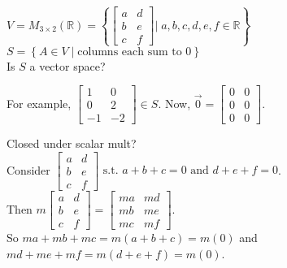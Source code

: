 \documentclass[../main.tex]{subfiles}
\begin{document}
\begin{example}
    \( V = M_{3 \times 2}(\mathbb{R}) =\left\{ \begin{bmatrix} a & d \\ b & e \\ c & f \end{bmatrix} \Bigg\vert \; a,b,c,d,e,f \in \mathbb{R} \right\} \) \\
    \( S = \left\{ A \in V \mid \text{columns each sum to 0} \right\} \) \\
    Is \( S \) a vector space?
    
    For example, \( \begin{bmatrix} 1 & 0 \\ 0 & 2 \\ -1 & -2 \end{bmatrix} \in S \).
    Now, \( \vec{0} = \begin{bmatrix} 0 & 0 \\ 0 & 0 \\ 0 & 0 \end{bmatrix} \).

    Closed under scalar mult? \checkmark \\
    Consider \( \begin{bmatrix} a & d \\ b & e \\ c & f \end{bmatrix} \text{ s.t. } a+b+c = 0 \text{ and } d+e+f=0 \). \\
    Then \( m\begin{bmatrix} a & d \\ b & e \\ c & f \end{bmatrix} = \begin{bmatrix} ma & md \\ mb & me \\ mc & mf \end{bmatrix} \). \\
    So \( ma+mb+mc = m(a+b+c) = m(0) \) and \( md+me+mf = m(d+e+f) = m(0) \). \checkmark


\end{example}
\end{document}
